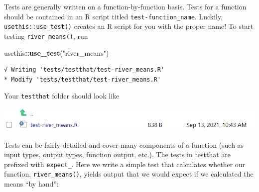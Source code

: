 \documentclass[
]{book}
\newenvironment{Shaded}{\begin{snugshade}}{\end{snugshade}}
\newcommand{\KeywordTok}[1]{\textcolor[rgb]{0.13,0.29,0.53}{\textbf{#1}}}
\newcommand{\NormalTok}[1]{#1}
\newcommand{\OperatorTok}[1]{\textcolor[rgb]{0.81,0.36,0.00}{\textbf{#1}}}
\newcommand{\StringTok}[1]{\textcolor[rgb]{0.31,0.60,0.02}{#1}}
\begin{document}
Tests are generally written on a function-by-function basis. Tests for a function should be contained in an R script titled \texttt{test-function\_name}. Luckily, \texttt{usethis::use\_test()} creates an R script for you with the proper name! To start testing \texttt{river\_means()}, run

\begin{Shaded}
\begin{Highlighting}[]
\NormalTok{usethis}\OperatorTok{::}\KeywordTok{use_test}\NormalTok{(}\StringTok{"river_means"}\NormalTok{)}
\end{Highlighting}
\end{Shaded}

\begin{verbatim}
√ Writing 'tests/testthat/test-river_means.R'
* Modify 'tests/testthat/test-river_means.R'
\end{verbatim}

Your \texttt{testthat} folder should look like

\includegraphics[width=1\linewidth]{images/newrpack_files5}

Tests can be fairly detailed and cover many components of a function (such as input types, output types, function output, etc.). The tests in testthat are prefixed with \texttt{expect\_}. Here we write a simple test that calculates whether our function, \texttt{river\_means()}, yields output that we would expect if we calculated the means ``by hand'':
\end{document}
